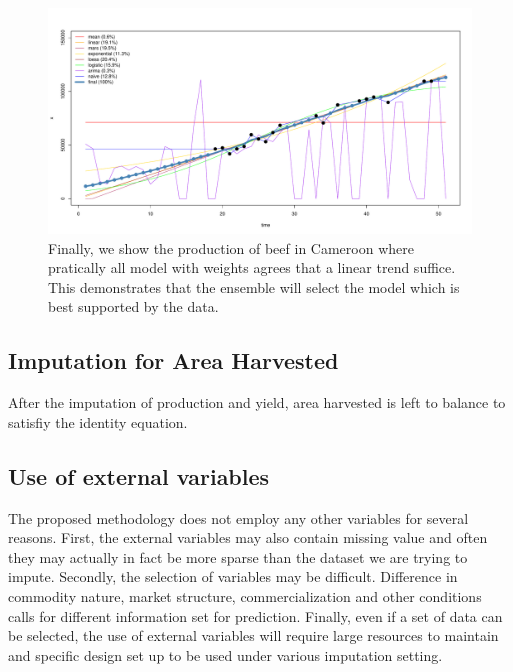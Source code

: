 \documentclass[nojss]{jss}\usepackage[]{graphicx}\usepackage[]{color}
\makeatletter
\def\maxwidth{ %
  \ifdim\Gin@nat@width>\linewidth
    \linewidth
  \else
    \Gin@nat@width
  \fi
}
\newenvironment{knitrout}{}{} %
\makeatother
\begin{document}
\begin{knitrout}
\color{fgcolor}\begin{figure}[!ht]


{\centering \includegraphics[width=\maxwidth]{figure/beef-cameroon} 

}

\caption[Finally, we show the production of beef in Cameroon where pratically all model with weights agrees that a linear trend suffice]{Finally, we show the production of beef in Cameroon where pratically all model with weights agrees that a linear trend suffice. This demonstrates that the ensemble will select the model which is best supported by the data.\label{fig:beef-cameroon}}
\end{figure}


\end{knitrout}

\FloatBarrier
\subsection{Imputation for Area Harvested}

After the imputation of production and yield, area harvested is left
to balance to satisfiy the identity equation.\\



\subsection{Use of external variables}
The proposed methodology does not employ any other variables for
several reasons. First, the external variables may also contain
missing value and often they may actually in fact be more sparse than
the dataset we are trying to impute. Secondly, the selection of
variables may be difficult. Difference in commodity nature, market
structure, commercialization and other conditions calls for different
information set for prediction. Finally, even if a set of data can be
selected, the use of external variables will require large resources
to maintain and specific design set up to be used under various
imputation setting.\\
\end{document}

